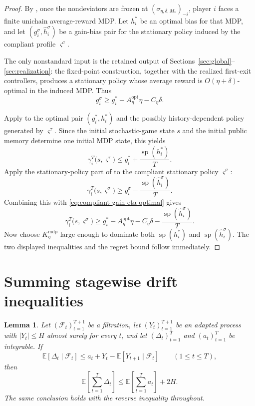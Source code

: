 \documentclass[12pt]{article}
\newtheorem{lemma}[theorem]{Lemma}
\theoremstyle{definition}
\newcommand{\E}{\mathbb{E}}
\newcommand{\1}{\mathbf{1}}
\newcommand{\cF}{\mathcal{F}}
\DeclareMathOperator{\spn}{sp}
\begin{document}
\begin{proof}
By , once the nondeviators are frozen at
$(\sigma_{\eta,\delta,M_*})_{-i}$, player $i$ faces a finite unichain
average-reward MDP. Let $h_i^*$ be an optimal bias for that MDP, and let
$(g_i^\sigma,\widehat h_i^\sigma)$ be a gain-bias pair for the stationary policy
induced by the compliant profile $\varsigma^\sigma$.

The only nonstandard input is the retained output of
Sections~\ref{sec:global}--\ref{sec:realization}: the fixed-point construction,
together with the realized first-exit controllers, produces a stationary policy
whose average reward is $O(\eta+\delta)$-optimal in the induced MDP. Thus
\begin{equation}
\label{eq:compliant-gain-eta-optimal}
g_i^\sigma
\ge
g_i^* - A_\eta^{\mathrm{opt}}\eta - C_\eta\delta.
\end{equation}

Apply  to the optimal pair $(g_i^*,h_i^*)$ and the
possibly history-dependent policy generated by $\varsigma^\tau$. Since the
initial stochastic-game state $s$ and the initial public memory determine one
initial MDP state, this yields
\[
\gamma_i^T\bigl(s,\varsigma^\tau\bigr)
\le
g_i^*+\frac{\spn(h_i^*)}{T}.
\]
Apply the stationary-policy part of  to the
compliant stationary policy $\varsigma^\sigma$:
\[
\gamma_i^T\bigl(s,\varsigma^\sigma\bigr)
\ge
g_i^\sigma-\frac{\spn(\widehat h_i^\sigma)}{T}.
\]
Combining this with \eqref{eq:compliant-gain-eta-optimal} gives
\[
\gamma_i^T\bigl(s,\varsigma^\sigma\bigr)
\ge
g_i^* - A_\eta^{\mathrm{opt}}\eta - C_\eta\delta - \frac{\spn(\widehat h_i^\sigma)}{T}.
\]
Now choose $K_\eta^{\mathrm{mdp}}$ large enough to dominate both
$\spn(h_i^*)$ and $\spn(\widehat h_i^\sigma)$. The two displayed inequalities and
the regret bound follow immediately.
\end{proof}



\section{Summing stagewise drift inequalities}
\label{app:aggregation}

\begin{lemma}
\label{lem:aggregation}
Let $(\cF_t)_{t=1}^{T+1}$ be a filtration, let $(Y_t)_{t=1}^{T+1}$ be an adapted
process with $|Y_t|\le H$ almost surely for every $t$, and let
$(\Delta_t)_{t=1}^T$ and $(a_t)_{t=1}^T$ be integrable. If
\[
\E[\Delta_t\mid \cF_t]
\le
a_t + Y_t - \E[Y_{t+1}\mid \cF_t]
\qquad (1\le t\le T),
\]
then
\[
\E\left[\sum_{t=1}^T \Delta_t\right]
\le
\E\left[\sum_{t=1}^T a_t\right] + 2H.
\]
The same conclusion holds with the reverse inequality throughout.
\end{lemma}
\end{document}
